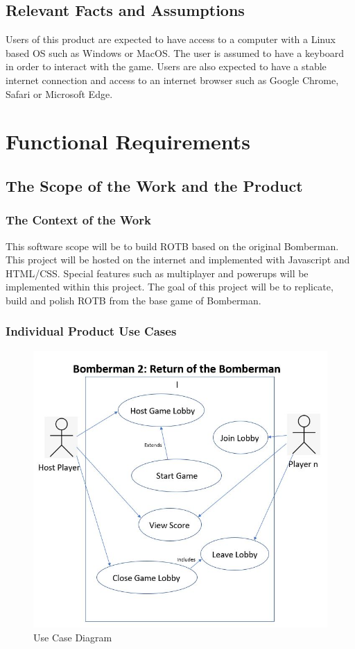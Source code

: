 \documentclass[12pt, titlepage]{article}
\begin{document}
\subsection{Relevant Facts and Assumptions}
Users of this product are expected to have access to a computer with a Linux based OS such as Windows or MacOS. The user is assumed to have a keyboard in order to interact with the game. Users are also expected to have a stable internet connection and access to an internet browser such as Google Chrome, Safari or Microsoft Edge.


\section{Functional Requirements}

\subsection{The Scope of the Work and the Product}


\subsubsection{The Context of the Work}

This software scope will be to build ROTB based on the original Bomberman. This project will be hosted on the internet and implemented with Javascript and HTML/CSS. Special features such as multiplayer and powerups will be implemented within this project. The goal of this project will be to replicate, build and polish ROTB from the base game of Bomberman. 

\subsubsection{Individual Product Use Cases}
\begin{figure}[h]
\centering
\includegraphics[width=12cm]{UseCaseDiagramServer}
\caption{Use Case Diagram}
\label{fig:figure1}
\end{figure}
\end{document}
